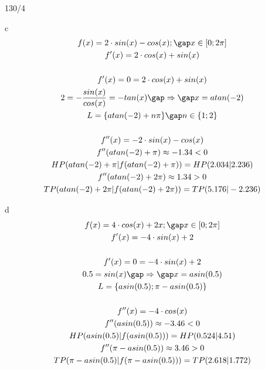 \newpage
\begin{exercise}{130/4}
  \item [c]
  \begin{gather*}
    f(x) = 2 \cdot sin(x) - cos(x); \gap x \in \left[0; 2\pi\right] \\
    f'(x) = 2 \cdot cos(x) + sin(x) \\\\
    f'(x) = 0 = 2 \cdot cos(x) + sin(x) \\
    2 = -\frac{sin(x)}{cos(x)} = -tan(x) \gap\Rightarrow\gap x = atan(-2) \\
    L = \{atan(-2) + n\pi\} \gap n \in \{1; 2\} \\\\
    f''(x) = -2 \cdot sin(x) - cos(x) \\
    f''(atan(-2) + \pi) \approx -1.34 < 0 \\
    HP(atan(-2) + \pi|f(atan(-2) + \pi)) = HP(2.034|2.236) \\
    f''(atan(-2) + 2\pi) \approx 1.34 > 0 \\
    TP(atan(-2) + 2\pi|f(atan(-2) + 2\pi)) = TP(5.176|-2.236)
  \end{gather*}
  \item [d]
  \begin{gather*}
    f(x) = 4 \cdot cos(x) + 2x; \gap x \in \left[0; 2\pi\right] \\
    f'(x) = -4 \cdot sin(x) + 2 \\\\
    f'(x) = 0 = -4 \cdot sin(x) + 2 \\
    0.5 = sin(x) \gap\Rightarrow\gap x = asin(0.5) \\
    L = \{asin(0.5); \pi - asin(0.5)\} \\\\
    f''(x) = -4 \cdot cos(x) \\
    f''(asin(0.5)) \approx -3.46 < 0 \\
    HP(asin(0.5)|f(asin(0.5))) = HP(0.524|4.51) \\
    f''(\pi - asin(0.5)) \approx 3.46 > 0 \\
    TP(\pi - asin(0.5)|f(\pi - asin(0.5))) = TP(2.618|1.772)
  \end{gather*}
\end{exercise}
